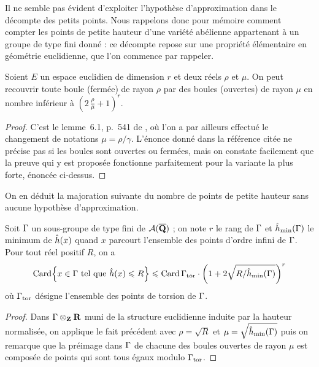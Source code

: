 Il ne semble pas évident d'exploiter l'hypothèse d'approximation dans le
décompte des petits points. Nous rappelons donc pour mémoire comment
compter les points de petite hauteur d'une variété abélienne appartenant à un
groupe de type fini donné : ce décompte repose sur une propriété élémentaire
en géométrie euclidienne, que l'on commence par rappeler.

\begin{fact}
  Soient \( E \) un espace euclidien de dimension \( r \) et deux réels \(
    \rho \) et \( \mu \). On peut recouvrir toute boule (fermée) de rayon \(
    \rho \) par des boules (ouvertes) de rayon \( \mu \) en nombre inférieur à
  \( ( 2 \, \frac\rho\mu + 1 )^r \).
\end{fact}

\begin{proof}
  C'est le lemme~6.1, p.~541 de \cite{remdcl}, où l'on a par ailleurs effectué
  le changement de notations \( \mu = \rho / \gamma \).  L'énonce donné dans
  la référence citée ne précise pas si les boules sont ouvertes ou fermées,
  mais on constate facilement que la preuve qui y est proposée fonctionne
  parfaitement pour la variante la plus forte, énoncée ci-dessus.
\end{proof}

On en déduit la majoration suivante du nombre de points de petite hauteur sans
aucune hypothèse d'approximation.

\begin{coro} \label{c:small-va}
  Soit \( \Gamma \) un sous-groupe de type fini de \( \mathcal A(\overline{{\mathbf{Q}}}) \) ; on note
  \( r \) le rang de \( \Gamma \) et \( \hat h_{\mathrm{min}}(\Gamma) \) le minimum de \(
    \hat h (x) \) quand \( x \) parcourt l'ensemble des points d'ordre infini de
  \( \Gamma \).  Pour tout réel positif \( R \), on a
  \begin{equation}
    \card \set*{
      x \in \grp
      \text{ tel que }
      \hautn x \le R
    }
    \le
    \card \grp_\torsion
    \cdot
    \left( 1 + 2\sqrt{R / \hmin(\grp)} \right)^r
  \end{equation}
  où \( \Gamma_{\mathrm{tor}} \) désigne l'ensemble des points de torsion de \( \Gamma
  \).
\end{coro}

\begin{proof}
  Dans \( \Gamma \otimes_{\mathbf{Z}} {\mathbf{R}} \) muni de la structure euclidienne induite par
  la hauteur normalisée, on applique le fait précédent avec \( \rho = \sqrt R
  \) et \( \mu = \sqrt{\hat h_{\mathrm{min}}(\Gamma)} \) puis on remarque que la préimage dans \(
    \Gamma \) de chacune des boules ouvertes de rayon \( \mu \) est composée
  de points qui sont tous égaux modulo \( \Gamma_{\mathrm{tor}} \).
\end{proof}

